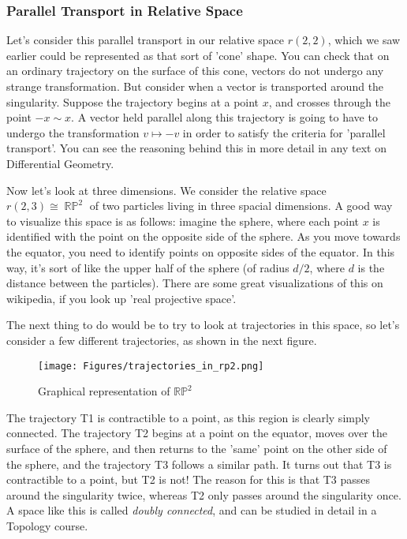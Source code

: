\documentclass{article}
\DeclareMathOperator{\RP}{\mathbb{RP}}
\begin{document}
\subsubsection{Parallel Transport in Relative Space}
Let's consider this parallel transport in our relative space $r(2,2)$, which we saw earlier could be represented as that sort of 'cone' shape. You can check that on an ordinary trajectory on the surface of this cone, vectors do not undergo any strange transformation. But consider when a vector is transported around the singularity. Suppose the trajectory begins at a point $x$, and crosses through the point $-x \sim x$. A vector held parallel along this trajectory is going to have to undergo the transformation $v \mapsto -v$ in order to satisfy the criteria for 'parallel transport'. You can see the reasoning behind this in more detail in any text on Differential Geometry.

Now let's look at three dimensions. We consider the relative space $r(2,3) \cong \RP^2$ of two particles living in three spacial dimensions. A good way to visualize this space is as follows: imagine the sphere, where each point $x$ is identified with the point on the opposite side of the sphere. As you move towards the equator, you need to identify points on opposite sides of the equator. In this way, it's sort of like the upper half of the sphere (of radius $d/2$, where $d$ is the distance between the particles). There are some great visualizations of this on wikipedia, if you look up 'real projective space'.

The next thing to do would be to try to look at trajectories in this space, so let's consider a few different trajectories, as shown in the next figure.

\begin{figure}[h]
    \centering
    \texttt{[image: Figures/trajectories\_in\_rp2.png]}
    \captionsetup{belowskip=-15pt}
    \caption{Graphical representation of $ \mathbb{RP}^2 $}
    \label{fig:23}
\end{figure}

The trajectory T1 is contractible to a point, as this region is clearly simply connected. The trajectory T2 begins at a point on the equator, moves over the surface of the sphere, and then returns to the 'same' point on the other side of the sphere, and the trajectory T3 follows a similar path. It turns out that T3 is contractible to a point, but T2 is not! The reason for this is that T3 passes around the singularity twice, whereas T2 only passes around the singularity once. A space like this is called \textit{doubly connected}, and can be studied in detail in a Topology course. 
\end{document}
